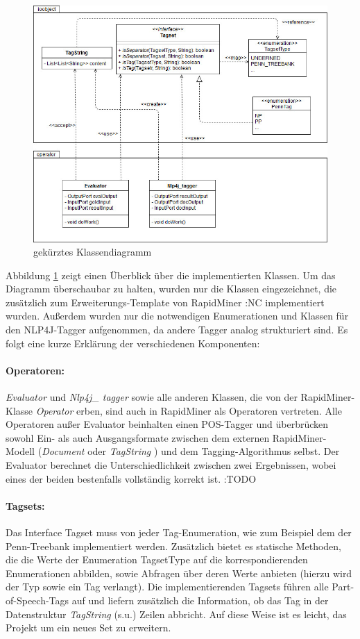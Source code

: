 \begin{figure}[htb]
	\includegraphics[width=\textwidth]{gfx/UML_Overview_simple.jpg}
	\caption{gekürztes Klassendiagramm}
	\label{fig:impl:structure:overview:uml}
\end{figure}

Abbildung \ref{fig:impl:structure:overview:uml} zeigt einen Überblick über die implementierten Klassen. Um das Diagramm überschaubar zu halten, wurden nur die Klassen eingezeichnet, die zusätzlich zum Erweiterungs-Template von RapidMiner :NC implementiert wurden. Außerdem wurden nur die notwendigen Enumerationen und Klassen für den NLP4J-Tagger aufgenommen, da andere Tagger analog strukturiert sind. Es folgt eine kurze Erklärung der verschiedenen Komponenten:

\paragraph{Operatoren:} \textit{Evaluator} und \textit{Nlp4j\_ tagger} sowie alle anderen Klassen, die von der RapidMiner-Klasse \textit{Operator} erben, sind auch in RapidMiner als Operatoren vertreten. Alle Operatoren außer Evaluator beinhalten einen POS-Tagger und überbrücken sowohl Ein- als auch Ausgangsformate zwischen dem externen RapidMiner-Modell (\textit{Document} oder \textit{TagString} ) und dem Tagging-Algorithmus selbst. Der Evaluator berechnet die Unterschiedlichkeit zwischen zwei Ergebnissen, wobei eines der beiden bestenfalls vollständig korrekt ist. :TODO

\paragraph{Tagsets:} Das Interface Tagset muss von jeder Tag-Enumeration, wie zum Beispiel dem der Penn-Treebank implementiert werden. Zusätzlich bietet es statische Methoden, die die Werte der Enumeration TagsetType auf die korrespondierenden Enumerationen abbilden, sowie Abfragen über deren Werte anbieten (hierzu wird der Typ sowie ein Tag verlangt). Die implementierenden Tagsets führen alle Part-of-Speech-Tags auf und liefern zusätzlich die Information, ob das Tag in der Datenstruktur \textit{TagString} (s.u.) Zeilen abbricht. Auf diese Weise ist es leicht, das Projekt um ein neues Set zu erweitern.

